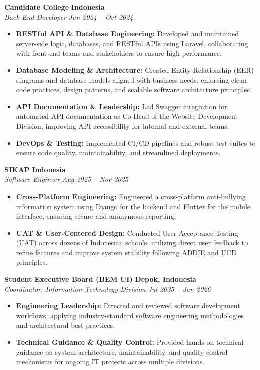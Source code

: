 \documentclass[letterpaper,10pt]{article}
\begin{document}
\noindent \textbf{\large Candidate College} \hfill \textbf{Indonesia} \\
\textit{Back End Developer} \hfill \textit{Jun 2024 -- Oct 2024}
\begin{itemize}
    \item \textbf{RESTful API \& Database Engineering:} Developed and maintained server-side logic, databases, and RESTful APIs using Laravel, collaborating with front-end teams and stakeholders to ensure high performance.
    \item \textbf{Database Modeling \& Architecture:} Created Entity-Relationship (EER) diagrams and database models aligned with business needs, enforcing clean code practices, design patterns, and scalable software architecture principles.
    \item \textbf{API Documentation \& Leadership:} Led Swagger integration for automated API documentation as Co-Head of the Website Development Division, improving API accessibility for internal and external teams.
    \item \textbf{DevOps \& Testing:} Implemented CI/CD pipelines and robust test suites to ensure code quality, maintainability, and streamlined deployments.
\end{itemize}
\vspace{3pt}

\noindent \textbf{\large SIKAP} \hfill \textbf{Indonesia} \\
\textit{Software Engineer} \hfill \textit{Aug 2025 -- Nov 2025}
\begin{itemize}
    \item \textbf{Cross-Platform Engineering:} Engineered a cross-platform anti-bullying information system using Django for the backend and Flutter for the mobile interface, ensuring secure and anonymous reporting.
    \item \textbf{UAT \& User-Centered Design:} Conducted User Acceptance Testing (UAT) across dozens of Indonesian schools, utilizing direct user feedback to refine features and improve system stability following ADDIE and UCD principles.
\end{itemize}
\vspace{3pt}

\noindent \textbf{\large Student Executive Board (BEM UI)} \hfill \textbf{Depok, Indonesia} \\
\textit{Coordinator, Information Technology Division} \hfill \textit{Jul 2025 -- Jan 2026}
\begin{itemize}
    \item \textbf{Engineering Leadership:} Directed and reviewed software development workflows, applying industry-standard software engineering methodologies and architectural best practices.
    \item \textbf{Technical Guidance \& Quality Control:} Provided hands-on technical guidance on system architecture, maintainability, and quality control mechanisms for ongoing IT projects across multiple divisions.
\end{itemize}
\vspace{3pt}
\end{document}
